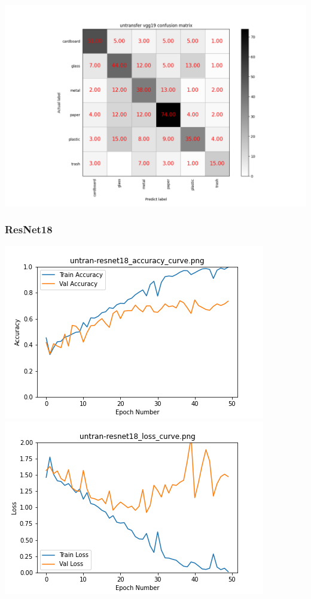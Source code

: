\documentclass[UTF8]{ctexart}
\begin{document}
\includegraphics[scale=0.5]{cm/unvgg19.png} 
\subsubsection{ResNet18}
\includegraphics[scale=0.5]{image/untran-resnet18_accuracy_curve.png} 
\includegraphics[scale=0.5]{image/untran-resnet18_loss_curve.png} 
\end{document}
